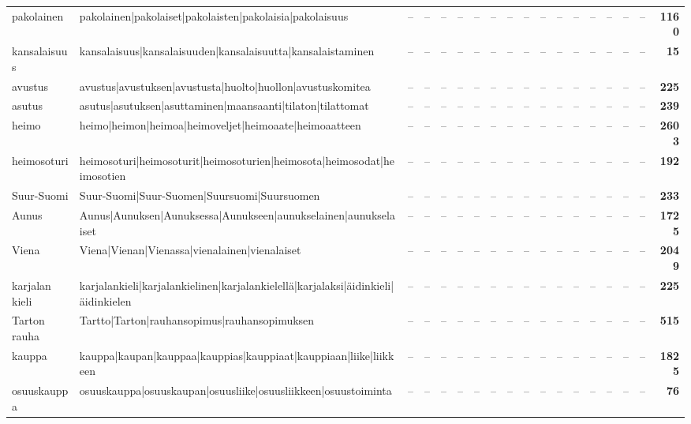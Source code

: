 \documentclass[10pt,a4paper]{article}
\begin{document}
\begin{center}
\begin{longtable}{@{}lp{52mm}rrrrrrrrrrrrrrrr@{}}
pakolainen & {\ttfamily pakolainen|pakolaiset|pakolaisten|pakolaisia|pakolaisuus} & -- & -- & -- & -- & -- & -- & -- & -- & -- & -- & -- & -- & -- & -- & -- & \textbf{1160} \\
kansalaisuus & {\ttfamily kansalaisuus|kansalaisuuden|kansalaisuutta|kansalaistaminen} & -- & -- & -- & -- & -- & -- & -- & -- & -- & -- & -- & -- & -- & -- & -- & \textbf{15} \\
avustus & {\ttfamily avustus|avustuksen|avustusta|huolto|huollon|avustuskomitea} & -- & -- & -- & -- & -- & -- & -- & -- & -- & -- & -- & -- & -- & -- & -- & \textbf{225} \\
asutus & {\ttfamily asutus|asutuksen|asuttaminen|maansaanti|tilaton|tilattomat} & -- & -- & -- & -- & -- & -- & -- & -- & -- & -- & -- & -- & -- & -- & -- & \textbf{239} \\
heimo & {\ttfamily heimo|heimon|heimoa|heimoveljet|heimoaate|heimoaatteen} & -- & -- & -- & -- & -- & -- & -- & -- & -- & -- & -- & -- & -- & -- & -- & \textbf{2603} \\
heimosoturi & {\ttfamily heimosoturi|heimosoturit|heimosoturien|heimosota|heimosodat|heimosotien} & -- & -- & -- & -- & -- & -- & -- & -- & -- & -- & -- & -- & -- & -- & -- & \textbf{192} \\
Suur-Suomi & {\ttfamily Suur-Suomi|Suur-Suomen|Suursuomi|Suursuomen} & -- & -- & -- & -- & -- & -- & -- & -- & -- & -- & -- & -- & -- & -- & -- & \textbf{233} \\
Aunus & {\ttfamily Aunus|Aunuksen|Aunuksessa|Aunukseen|aunukselainen|aunukselaiset} & -- & -- & -- & -- & -- & -- & -- & -- & -- & -- & -- & -- & -- & -- & -- & \textbf{1725} \\
Viena & {\ttfamily Viena|Vienan|Vienassa|vienalainen|vienalaiset} & -- & -- & -- & -- & -- & -- & -- & -- & -- & -- & -- & -- & -- & -- & -- & \textbf{2049} \\
karjalan kieli & {\ttfamily karjalankieli|karjalankielinen|karjalankielellä|karjalaksi|äidinkieli|äidinkielen} & -- & -- & -- & -- & -- & -- & -- & -- & -- & -- & -- & -- & -- & -- & -- & \textbf{225} \\
Tarton rauha & {\ttfamily Tartto|Tarton|rauhansopimus|rauhansopimuksen} & -- & -- & -- & -- & -- & -- & -- & -- & -- & -- & -- & -- & -- & -- & -- & \textbf{515} \\
kauppa & {\ttfamily kauppa|kaupan|kauppaa|kauppias|kauppiaat|kauppiaan|liike|liikkeen} & -- & -- & -- & -- & -- & -- & -- & -- & -- & -- & -- & -- & -- & -- & -- & \textbf{1825} \\
osuuskauppa & {\ttfamily osuuskauppa|osuuskaupan|osuusliike|osuusliikkeen|osuustoiminta} & -- & -- & -- & -- & -- & -- & -- & -- & -- & -- & -- & -- & -- & -- & -- & \textbf{76} \\

\end{longtable}
\end{center}
\end{document}
